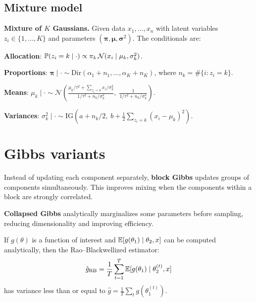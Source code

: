 \subsection{Mixture model}

\begin{example}
\textbf{Mixture of $K$ Gaussians.} Given data $x_1, \ldots, x_n$
with latent variables $z_i \in \{1, \ldots, K\}$ and parameters
$(\boldsymbol{\pi}, \boldsymbol{\mu}, \boldsymbol{\sigma}^2)$.
The conditionals are:

\textbf{Allocation}:
$\mathbb{P}(z_i = k \mid \cdot) \propto \pi_k\,\mathcal{N}(x_i \mid \mu_k, \sigma_k^2)$.

\textbf{Proportions}:
$\boldsymbol{\pi} \mid \cdot \sim \text{Dir}(\alpha_1 + n_1, \ldots, \alpha_K + n_K)$,
where $n_k = \#\{i : z_i = k\}$.

\textbf{Means}:
$\mu_k \mid \cdot \sim \mathcal{N}\!\left(\frac{\mu_0/\tau^2 + \sum_{z_i=k} x_i/\sigma_k^2}{1/\tau^2 + n_k/\sigma_k^2},\;
\frac{1}{1/\tau^2 + n_k/\sigma_k^2}\right)$.

\textbf{Variances}:
$\sigma_k^2 \mid \cdot \sim \text{IG}\!\left(a + n_k/2,\;
b + \frac{1}{2}\sum_{z_i=k}(x_i - \mu_k)^2\right)$.
\end{example}

\section{Gibbs variants}

\begin{definition}
Instead of updating each component separately, \textbf{block Gibbs}
updates groups of components simultaneously. This improves mixing when
the components within a block are strongly correlated.
\end{definition}

\begin{definition}
\textbf{Collapsed Gibbs} analytically marginalizes some parameters
before sampling, reducing dimensionality and improving efficiency.
\end{definition}

\begin{theorem}
If $g(\theta)$ is a function of interest and
$\mathbb{E}[g(\theta_1) \mid \theta_2, x]$ can be computed analytically, then
the Rao--Blackwellized estimator:
\[
  \hat{g}_{\text{RB}} = \frac{1}{T}\sum_{t=1}^T
  \mathbb{E}[g(\theta_1) \mid \theta_2^{(t)}, x]
\]
has variance less than or equal to
$\hat{g} = \frac{1}{T}\sum_t g(\theta_1^{(t)})$.
\end{theorem}

